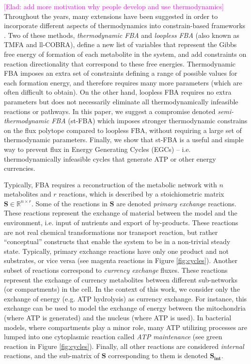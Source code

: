 \documentclass[twocolumn]{bmcart}%
\newcommand{\elad}[1]{{\textcolor{magenta}{[Elad: {#1}]}}}
\newcommand{\Sint}{\mathbf{S_{int}}}
\begin{document}
\elad{add more motivation why people develop and use thermodynamics}
Throughout the years, many extensions have been suggested in order to incorporate different aspects of thermodynamics into constrain-based frameworks \cite{Beard2002-xt, Warren2007-wm, Henry2007-xp, Schellenberger2011-bq, Price2006-ua, Bordel2010-pl, Fleming2010-py, Holzhutter2004-qj, Fleming2009-um, Kummel2006-qn, Henry2006-nt, Hoppe2007-sw, De_Martino2012-cj, Tepper2013-gd, Nolan2006-eg, Nagrath2007-bn, Boghigian2010-vz}.
Two of these methods, \textit{thermodynamic FBA} \cite{Henry2007-xp} and \textit{loopless FBA} \cite{Schellenberger2011-bq} (also known as TMFA and ll-COBRA), define a new list of variables that represent the Gibbs free energy of formation of each metabolite in the system, and add constraints on reaction directionality that correspond to these free energies. Thermodynamic FBA imposes an extra set of constraints defining a range of possible values for each formation energy, and therefore requires many more parameters (which are often difficult to obtain). On the other hand, loopless FBA requires no extra parameters but does not necessarily eliminate all thermodynamically infeasible reactions or pathways. In this paper, we suggest a compromise denoted \textit{semi-thermodynamic FBA} (st-FBA) which imposes stronger thermodynamic constrains on the flux polytope compared to loopless FBA, without requiring a large set of thermodynamic parameters. Finally, we show that st-FBA is a useful and simple way to prevent flux in Energy Generating Cycles (EGCs) -- i.e. thermodynamically infeasible cycles that generate ATP or other energy currencies.

Typically, FBA requires a reconstruction of the metabolic network with $n$ metabolites and $r$ reactions, which is described by a stoichiometric matrix $\mathbf{S} \in \mathbb{R}^{n \times r}$. Some of the reactions in $\mathbf{S}$ are denoted \emph{primary exchange} reactions. These reactions represent the exchange of material between the model and the environment, i.e. input of nutrients and export of by-products. These reactions are not real chemical transformations nor transport reaction, but rather ``conceptual'' constructs that enable the system to be in a non-trivial steady state. Typically, primary exchange reactions have only one product and not substrates, or vice versa (see magenta reactions in Figure \ref{fig:cycles}). Another subset of reactions correspond to \emph{currency exchange} fluxes. These reactions represent the exchange of currency metabolites between different sub-networks (or compartments) in the cell. In the context of this work, we consider only the exchange of energy (e.g. ATP hydrolysis) as currency exchange. For instance, this exchange can be used to model the exchange of energy between the mitochondria (where ATP is generated) and the nucleus (where ATP is used). In bacterial models, where compartments play a minor role, many ATP utilizing processes are lumped into one cytoplasmic reaction called \emph{ATP maintenance} (see green reaction in Figure \ref{fig:cycles}). Finally, all other reactions are considered \emph{internal} reactions, and the sub-matrix of $\mathbf{S}$ corresponding to them is denoted $\Sint$.
\end{document}

